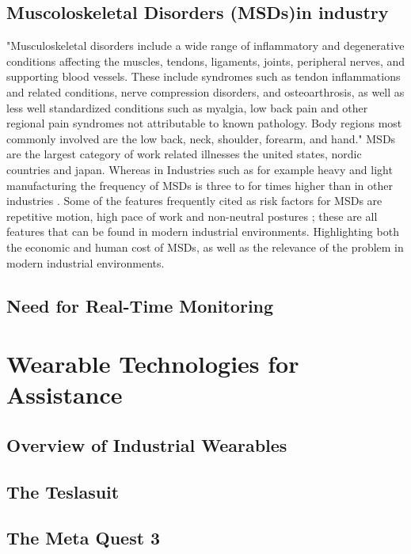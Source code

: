 \subsection{Muscoloskeletal Disorders (MSDs)in industry}
"Musculoskeletal disorders include a wide range of inflammatory and degenerative conditions affecting the muscles, tendons, ligaments, joints, peripheral nerves, and supporting blood vessels. These include syndromes such as tendon inflammations and related conditions, nerve compression disorders, and osteoarthrosis, as well as less well standardized conditions such as myalgia, low back pain and other regional pain syndromes not attributable to known pathology. Body regions most commonly involved are the low back, neck, shoulder, forearm, and hand." \cite{punnett2004wrmsd}
MSDs are the largest category of work related illnesses the united states, nordic countries and japan. Whereas in Industries such as for example heavy and light manufacturing the frequency of MSDs is three to for times higher than in other industries \cite{punnett2004wrmsd}. 
Some of the features frequently cited as risk factors for MSDs are repetitive motion, high pace of work and non-neutral postures \cite{punnett2004wrmsd}; these are all features that can be found in modern industrial environments. Highlighting both the economic and human cost of MSDs, as well as the relevance of the problem in modern industrial environments.

\subsection{Need for Real-Time Monitoring}


\section{Wearable Technologies for Assistance}
\subsection{Overview of Industrial Wearables}

\subsection{The Teslasuit}

\subsection{The Meta Quest 3}

